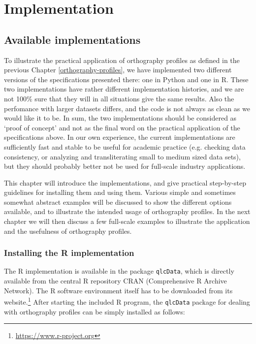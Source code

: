 \chapter{Implementation}
\label{implementation}

\section{Available implementations}
\label{available-implementations}

To illustrate the practical application of orthography profiles as defined in
the previous Chapter \ref{orthography-profiles}, we have implemented two
different versions of the specifications presented there: one in Python and one
in R. These two implementations have rather different implementation histories,
and we are not 100\% sure that they will in all situations give the same
results. Also the perfomance with larger datasets differs, and the code is not
always as clean as we would like it to be. In sum, the two implementations
should be considered as `proof of concept' and not as the final word on the
practical application of the specifications above. In our own experience, the
current implementations are sufficiently fast and stable to be useful for
academic practice (e.g. checking data consistency, or analyzing and
transliterating small to medium sized data sets), but they should probably
better not be used for full-scale industry applications.

This chapter will introduce the implementations, and give practical step-by-step 
guidelines for installing them and using them. Various simple and sometimes 
somewhat abstract examples will be discussed to show the different options 
available, and to illustrate the intended usage of orthography profiles. In the 
next chapter we will then discuss a few full-scale examples to illustrate the 
application and the usefulness of orthography profiles.

\subsection*{Installing the R implementation}

The R implementation is available in the package \texttt{qlcData}, which is 
directly available from the central R repository CRAN (Comprehensive R Archive 
Network). The R software environment itself has to be downloaded from its 
website.\footnote{\url{https://www.r-project.org}} After starting the included 
R program, the \texttt{qlcData} package for dealing with orthography profiles can be 
simply installed as follows:


